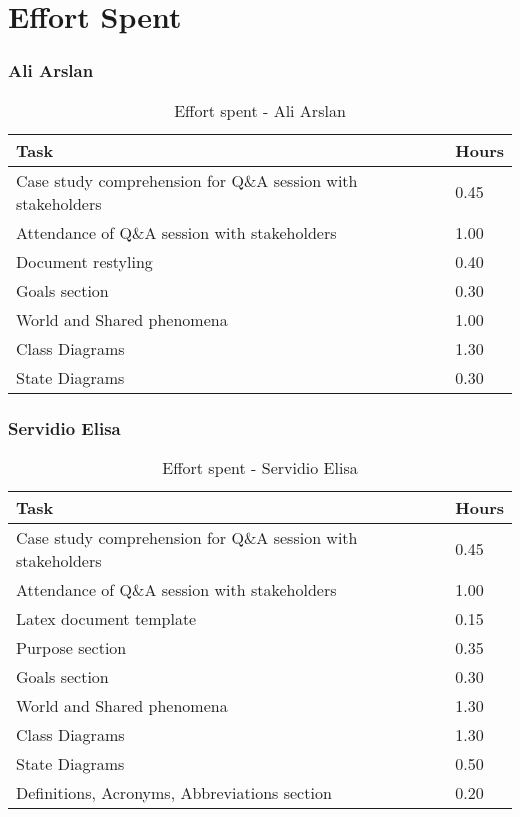 \chapter{Effort Spent}

\subsection{Ali Arslan}
\renewcommand{\arraystretch}{2}
\begin{longtable}{|m{9cm}|m{1.2cm}|}
\caption{Effort spent - Ali Arslan}\\
\hline
\endfirsthead
\endhead
\hline
\endlastfoot
\rowcolor{white!40!blue!70}
\textbf{Task} & \hfil {\textbf{Hours}}\\
\hline
Case study comprehension for Q\&A session with stakeholders & \hfil 0.45\\
Attendance of Q\&A session with stakeholders & \hfil 1.00\\
Document restyling	& \hfil 0.40\\
Goals section & \hfil 0.30\\
World and Shared phenomena & \hfil 1.00\\
Class Diagrams & \hfil 1.30\\
State Diagrams & \hfil 0.30\\
\hline
\end{longtable}

\subsection{Servidio Elisa}
\renewcommand{\arraystretch}{2}
\begin{longtable}{|m{9cm}|m{1.2cm}|}
\caption{Effort spent - Servidio Elisa}\\
\hline
\endfirsthead
\endhead
\hline
\endlastfoot
\rowcolor{white!40!blue!70}
\textbf{Task} &\hfil {\textbf{Hours}}\\
\hline
Case study comprehension for Q\&A session with stakeholders & \hfil 0.45\\
Attendance of Q\&A session with stakeholders & \hfil 1.00\\
Latex document template & \hfil 0.15\\
Purpose section	& \hfil 0.35\\
Goals section & \hfil 0.30\\
World and Shared phenomena & \hfil 1.30\\
Class Diagrams & \hfil 1.30\\
State Diagrams & \hfil 0.50\\
Definitions, Acronyms, Abbreviations section & \hfil 0.20\\
\hline
\end{longtable}

